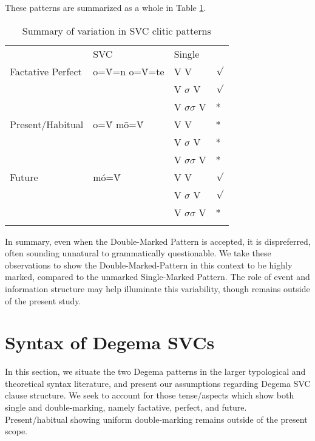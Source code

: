 \documentclass[output=paper]{langsci/langscibook}
\begin{document}
These patterns are summarized as a whole in Table \ref{table:4}.

\begin{table}

\begin{tabularx}{\textwidth}{XXXX}
\lsptoprule

\multicolumn{2}{X}{} & {SVC}  & {Single}\\
{Factative} {Perfect} & {o=\'{V}=n} {o=\'{V}=te} & {V V} & {${\surd}$}\\
\hhline{--~~} &  & {V $\sigma $ V} & {${\surd}$}\\
&  & {V $\sigma \sigma $ V} & {*}\\
{Present/Habitual} & {o=\'{V} mō=\'{V}} & {V V} & {*}\\
&  & {V $\sigma $ V} & {*}\\
&  & {V $\sigma \sigma $ V} & {*}\\
{Future} & {mó=\'{V}} & {V V} & {${\surd}$}\\
\hhline{--~~} &  & {V $\sigma $ V} & {${\surd}$}\\
&  & {V $\sigma \sigma $ V} & {*}\\
\hhline{~~--}
\lspbottomrule
\end{tabularx}
\caption{Summary of variation in SVC clitic patterns}
\label{table:4}
\end{table}


In summary, even when the Double-Marked Pattern is accepted, it is dispreferred, often sounding unnatural to grammatically questionable. We take these observations to show the Double-Marked-Pattern in this context to be highly marked, compared to the unmarked Single-Marked Pattern. The role of event and information structure may help illuminate this variability, though remains outside of the present study.

\section{Syntax of Degema SVCs}

In this section, we situate the two Degema patterns in the larger typological and theoretical syntax literature, and present our assumptions regarding Degema SVC clause structure. We seek to account for those tense/aspects which show both single and double-marking, namely factative, perfect, and future. Present/habitual showing uniform double-marking remains outside of the present scope. 
\end{document}
